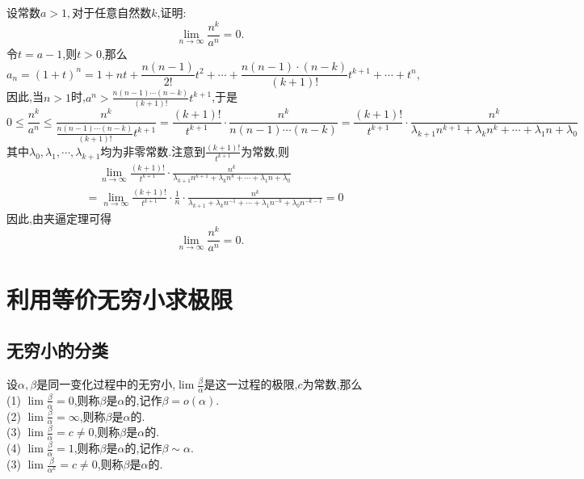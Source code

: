 \examples 设常数$a>1,$对于任意自然数$k$,证明:
\begin{equation*}
	\lim\limits_{n \to \infty}\frac{n^k}{a^n}=0.
\end{equation*}
\hspace*{-0.5em}\proof 令$t=a-1$,则$t>0$,那么
\[
a_n=(1+t)^n=1+nt+\frac{n(n-1)}{2!}t^2+\cdots+\frac{n(n-1)\cdot(n-k)}{(k+1)!}t^{k+1}+\cdots+t^n,
\]
因此,当$n>1$时,$\displaystyle a^n>\frac{n(n-1)\cdots(n-k)}{(k+1)!}t^{k+1}$,于是
\[
0 \le \frac{n^k}{a^n}\le \frac{n^k}{\displaystyle \frac{n(n-1)\cdots(n-k)}{(k+1)!}t^{k+1}}=\frac{(k+1)!}{t^{k+1}}\cdot \frac{n^k}{n(n-1)\cdots(n-k)}=\frac{(k+1)!}{t^{k+1}}\cdot\frac{n^k}{\lambda_{k+1}n^{k+1}+\lambda_kn^k+\cdots+\lambda_1n+\lambda_0}
\]
其中$\lambda_0,\lambda_1,\cdots,\lambda_{k+1}$均为非零常数.注意到$\displaystyle \frac{(k+1)!}{t^{k+1}}$为常数,则
\begin{equation*}
	\begin{split}
		&\quad \, \lim\limits_{n \to \infty}\frac{(k+1)!}{t^{k+1}}\cdot\frac{n^k}{\lambda_{k+1}n^{k+1}+\lambda_kn^k+\cdots+\lambda_1n+\lambda_0}\\
		&=\lim\limits_{n \to \infty}\frac{(k+1)!}{t^{k+1}}\cdot\frac{1}{n}\cdot \frac{n^k}{\lambda_{k+1}+\lambda_kn^{-1}+\cdots+\lambda_1n^{-k}+\lambda_0n^{-k-1}}=0
	\end{split}
\end{equation*}
因此,由夹逼定理可得
\begin{equation*}
	\lim\limits_{n \to \infty}\frac{n^k}{a^n}=0.
\end{equation*}

\section{利用等价无穷小求极限}
\subsection{无穷小的分类}
\tdefination[无穷小的分类]
设$\alpha,\beta $是同一变化过程中的无穷小,$\displaystyle \lim \frac{\beta}{\alpha}$是这一过程的极限,$c$为常数,那么\\[0.5em]
\noindent (1) \quad $\displaystyle \lim \frac{\beta }{\alpha}=0$,则称$\beta $是$\alpha $的,记作$\beta = o(\alpha)$.\\[0.5em]
\noindent (2) \quad  $\displaystyle \lim \frac{\beta }{\alpha}=\infty$,则称$\beta $是$\alpha $的.\\[0.5em]
\noindent (3) \quad  $\displaystyle \lim \frac{\beta }{\alpha}=c \ne 0$,则称$\beta $是$\alpha $的.\\[0.5em]
\noindent (4) \quad  $\displaystyle \lim \frac{\beta }{\alpha}=1$,则称$\beta $是$\alpha $的,记作$\beta \sim \alpha$.\\[0.5em]
\noindent (3) \quad  $\displaystyle \lim \frac{\beta }{\alpha^k}=c \ne 0$,则称$\beta $是$\alpha $的.

